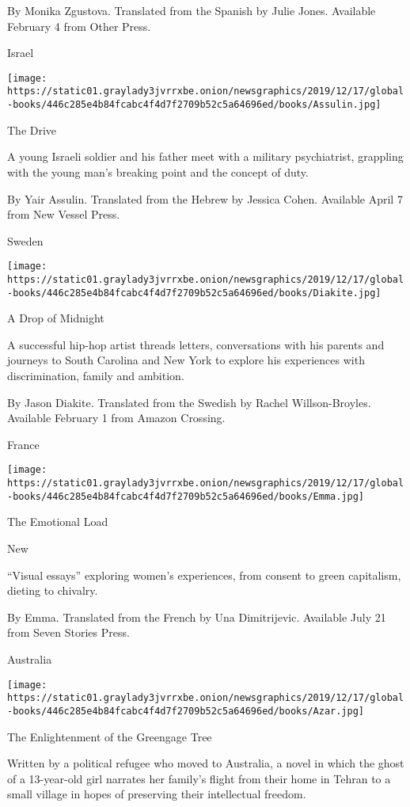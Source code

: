  By Monika Zgustova. Translated from the Spanish by Julie Jones.
Available February 4 from Other Press.

Israel

\texttt{[image: https://static01.graylady3jvrrxbe.onion/newsgraphics/2019/12/17/global-books/446c285e4b84fcabc4f4d7f2709b52c5a64696ed/books/Assulin.jpg]}

The Drive

A young Israeli soldier and his father meet with a military
psychiatrist, grappling with the young man's breaking point and the
concept of duty.

 By Yair Assulin. Translated from the Hebrew by Jessica Cohen. Available
April 7 from New Vessel Press.

Sweden

\texttt{[image: https://static01.graylady3jvrrxbe.onion/newsgraphics/2019/12/17/global-books/446c285e4b84fcabc4f4d7f2709b52c5a64696ed/books/Diakite.jpg]}

A Drop of Midnight

A successful hip-hop artist threads letters, conversations with his
parents and journeys to South Carolina and New York to explore his
experiences with discrimination, family and ambition.

 By Jason Diakite. Translated from the Swedish by Rachel
Willson-Broyles. Available February 1 from Amazon Crossing.

France

\texttt{[image: https://static01.graylady3jvrrxbe.onion/newsgraphics/2019/12/17/global-books/446c285e4b84fcabc4f4d7f2709b52c5a64696ed/books/Emma.jpg]}

The Emotional Load

New

``Visual essays'' exploring women's experiences, from consent to green
capitalism, dieting to chivalry.

 By Emma. Translated from the French by Una Dimitrijevic. Available July
21 from Seven Stories Press.

Australia

\texttt{[image: https://static01.graylady3jvrrxbe.onion/newsgraphics/2019/12/17/global-books/446c285e4b84fcabc4f4d7f2709b52c5a64696ed/books/Azar.jpg]}

The Enlightenment of the Greengage Tree

Written by a political refugee who moved to Australia, a novel in which
the ghost of a 13-year-old girl narrates her family's flight from their
home in Tehran to a small village in hopes of preserving their
intellectual freedom.

